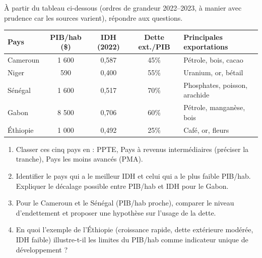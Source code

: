 \documentclass[11pt]{article}
\newcounter{popsec}
\newcounter{popsub}
\newcommand{\courssub}[1]{%
  \stepcounter{popsub}%
  \par\vspace{9pt}\noindent{\popxbold\fontsize{11.5}{13}\selectfont\color{popink}{\color{poporange}\thepopsec.\thepopsub}\hspace{6pt}#1}\par\nopagebreak\vspace{4pt}
}
\begin{document}
\courssub{Je m'entraîne}

\begin{exercice}
À partir du tableau ci-dessous (ordres de grandeur 2022--2023, à manier avec prudence car les sources varient), répondre aux questions.
\begin{center}
\begin{tabular}{|l|c|c|c|l|}\hline
\textbf{Pays} & \textbf{PIB/hab (\$)} & \textbf{IDH (2022)} & \textbf{Dette ext./PIB} & \textbf{Principales exportations} \\ \hline
Cameroun & 1 600 & 0,587 & 45\% & Pétrole, bois, cacao \\
Niger & 590 & 0,400 & 55\% & Uranium, or, bétail \\
Sénégal & 1 600 & 0,517 & 70\% & Phosphates, poisson, arachide \\
Gabon & 8 500 & 0,706 & 60\% & Pétrole, manganèse, bois \\
Éthiopie & 1 000 & 0,492 & 25\% & Café, or, fleurs \\ \hline
\end{tabular}
\end{center}
\begin{enumerate}
\item Classer ces cinq pays en : PPTE, Pays à revenus intermédiaires (préciser la tranche), Pays les moins avancés (PMA).
\item Identifier le pays qui a le meilleur IDH et celui qui a le plus faible PIB/hab. Expliquer le décalage possible entre PIB/hab et IDH pour le Gabon.
\item Pour le Cameroun et le Sénégal (PIB/hab proche), comparer le niveau d'endettement et proposer une hypothèse sur l'usage de la dette.
\item En quoi l'exemple de l'Éthiopie (croissance rapide, dette extérieure modérée, IDH faible) illustre-t-il les limites du PIB/hab comme indicateur unique de développement ?
\end{enumerate}
\end{exercice}
\end{document}
